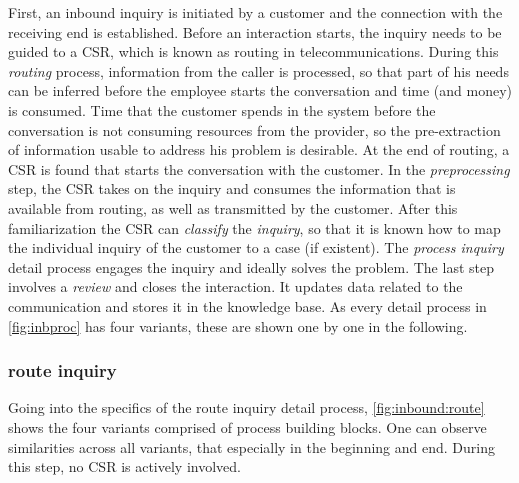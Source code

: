 	 First, an inbound inquiry is initiated by a customer and the connection with the receiving end is established. Before an interaction starts, the inquiry needs to be guided to a \acrshort{CSR}, which is known as routing in telecommunications. During this \textit{routing} process, information from the caller is processed, so that part of his needs can be inferred before the employee starts the conversation and time (and money) is consumed. Time that the customer spends in the system before the conversation is not consuming resources from the provider, so the pre-extraction of information usable to address his problem is desirable. At the end of routing, a \acrshort{CSR} is found that starts the conversation with the customer. In the \textit{preprocessing} step, the \acrshort{CSR} takes on the inquiry and consumes the information that is available from routing, as well as transmitted by the customer. After this familiarization the \acrshort{CSR} can \textit{classify} the \textit{inquiry}, so that it is known how to map the individual inquiry of the customer to a case (if existent). The \textit{process inquiry} detail process engages the inquiry and ideally solves the problem. The last step involves a \textit{review} and closes the interaction. It updates data related to the communication and stores it in the knowledge base. As every detail process in \Fig \ref{fig:inbproc} has four variants, these are shown one by one in the following. 
	 
	 \subsubsection{route inquiry}
	 
	 Going into the specifics of the route inquiry detail process, \Fig \ref{fig:inbound:route} shows the four variants comprised of process building blocks. One can observe similarities 
	 across all variants, that especially in the beginning and end. During this step, no \acrshort{CSR} is actively involved.
	 \\
	 
